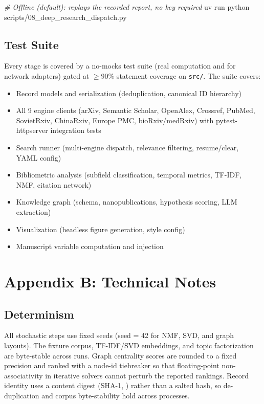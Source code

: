 \documentclass[
]{article}
\newenvironment{Shaded}{}{}
\newcommand{\CommentTok}[1]{\textcolor[rgb]{0.38,0.63,0.69}{\textit{#1}}}
\newcommand{\ExtensionTok}[1]{#1}
\newcommand{\NormalTok}[1]{#1}
\providecommand{\tightlist}{%
  \setlength{\itemsep}{0pt}\setlength{\parskip}{0pt}}
\begin{document}
\begin{Shaded}
\begin{Highlighting}[]
\CommentTok{\# Offline (default): replays the recorded report, no key required}
\ExtensionTok{uv}\NormalTok{ run python scripts/08\_deep\_research\_dispatch.py}
\end{Highlighting}
\end{Shaded}

\subsection{Test Suite}\label{test-suite}

Every stage is covered by a no-mocks test suite (real computation and
 for network adapters) gated at \(\geq 90\%\)
statement coverage on \texttt{src/}. The suite covers:

\begin{itemize}
\tightlist
\item
  Record models and serialization (deduplication, canonical ID
  hierarchy)
\item
  All 9 engine clients (arXiv, Semantic Scholar, OpenAlex, Crossref,
  PubMed, SovietRxiv, ChinaRxiv, Europe PMC, bioRxiv/medRxiv) with
  pytest-httpserver integration tests
\item
  Search runner (multi-engine dispatch, relevance filtering,
  resume/clear, YAML config)
\item
  Bibliometric analysis (subfield classification, temporal metrics,
  TF-IDF, NMF, citation network)
\item
  Knowledge graph (schema, nanopublications, hypothesis scoring, LLM
  extraction)
\item
  Visualization (headless figure generation, style config)
\item
  Manuscript variable computation and injection
\end{itemize}

\newpage

\section{Appendix B: Technical Notes}\label{appendix-b-technical-notes}

\subsection{Determinism}\label{determinism}

All stochastic steps use fixed seeds (seed = 42 for NMF, SVD, and graph
layouts). The fixture corpus, TF-IDF/SVD embeddings, and topic
factorization are byte-stable across runs. Graph centrality scores are
rounded to a fixed precision and ranked with a node-id tiebreaker so
that floating-point non-associativity in iterative solvers cannot
perturb the reported rankings. Record identity uses a content digest
(SHA-1, ) rather than a salted hash, so
de-duplication and corpus byte-stability hold across processes.
\end{document}
